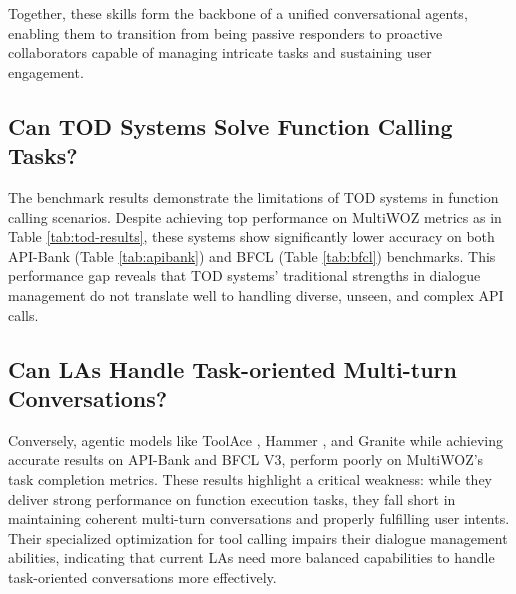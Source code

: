 Together, these skills form the backbone of a unified conversational agents, enabling them to transition from being passive responders to proactive collaborators capable of managing intricate tasks and sustaining user engagement. 


\subsection{Can TOD Systems Solve Function Calling Tasks?}
The benchmark results demonstrate the limitations of TOD systems in function calling scenarios. Despite achieving top performance on MultiWOZ metrics as in Table \ref{tab:tod-results}, these systems show significantly lower accuracy on both API-Bank (Table \ref{tab:apibank}) and BFCL (Table \ref{tab:bfcl}) benchmarks. This performance gap reveals that TOD systems' traditional strengths in dialogue management do not translate well to handling diverse, unseen, and complex API calls.


\subsection{Can LAs Handle Task-oriented Multi-turn Conversations?}
Conversely, agentic models like ToolAce \cite{Liu2024ToolACE}, Hammer \cite{Lin2024Hammer}, and Granite \cite{abdelaziz-etal-2024-granite} while achieving accurate results on API-Bank and BFCL V3, perform poorly on MultiWOZ's task completion metrics. These results highlight a critical weakness: while they deliver strong performance on function execution tasks, they fall short in maintaining coherent multi-turn conversations and properly fulfilling user intents. Their specialized optimization for tool calling impairs their dialogue management abilities, indicating that current LAs need more balanced capabilities to handle task-oriented conversations more effectively.


